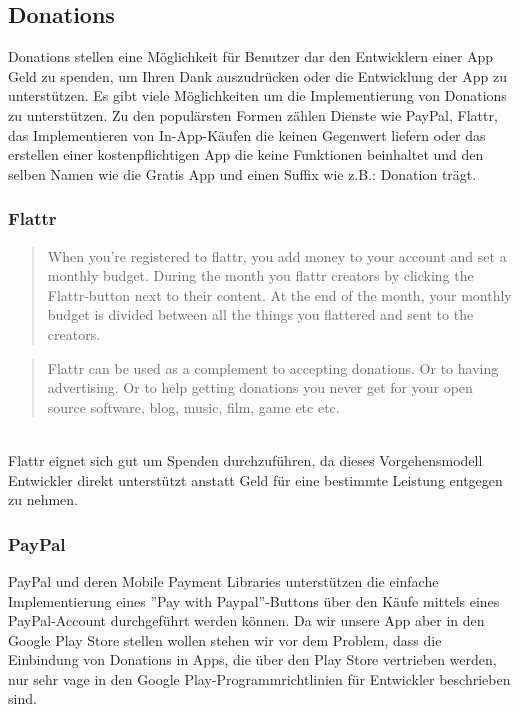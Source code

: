 \documentclass[FIPLY_base.tex]{subfiles}
\author{Andreas Denkmayr}
\date{25. Februar 2016}
\begin{document}
\subsection{Donations}
Donations stellen eine Möglichkeit für Benutzer dar den Entwicklern einer App Geld zu spenden, um Ihren Dank auszudrücken oder die Entwicklung der App zu unterstützen.
Es gibt viele Möglichkeiten um die Implementierung von Donations zu unterstützen.\newline
Zu den populärsten Formen zählen Dienste wie PayPal, Flattr, das Implementieren von In-App-Käufen die keinen Gegenwert liefern oder das erstellen einer kostenpflichtigen App die keine Funktionen beinhaltet und den selben Namen wie die Gratis App und einen Suffix wie z.B.: Donation trägt.


\subsubsection{Flattr}
\begin{quote}
When you're registered to flattr, you add money to your account and set a monthly budget. During the month you flattr creators by clicking the Flattr-button next to their content. At the end of the month, your monthly budget is divided between all the things you flattered and sent to the creators.
\end{quote}\cite{flattr} 

\begin{quote}
Flattr can be used as a complement to accepting donations. Or to having advertising. Or to help getting donations you never get for your open source software, blog, music, film, game etc etc.
\end{quote}\cite{flattr} 

\ \\
Flattr eignet sich gut um Spenden durchzuführen, da dieses Vorgehensmodell Entwickler direkt unterstützt anstatt Geld für eine bestimmte Leistung entgegen zu nehmen. 

\newpage
\subsubsection{PayPal}
PayPal und deren Mobile Payment Libraries unterstützen die einfache Implementierung eines ''Pay with Paypal''-Buttons über den Käufe mittels eines PayPal-Account durchgeführt werden können.
Da wir unsere App aber in den Google Play Store stellen wollen stehen wir vor dem Problem, dass die Einbindung von Donations in Apps, die über den Play Store vertrieben werden, nur sehr vage in den Google Play-Programmrichtlinien für Entwickler beschrieben sind.
\end{document}
